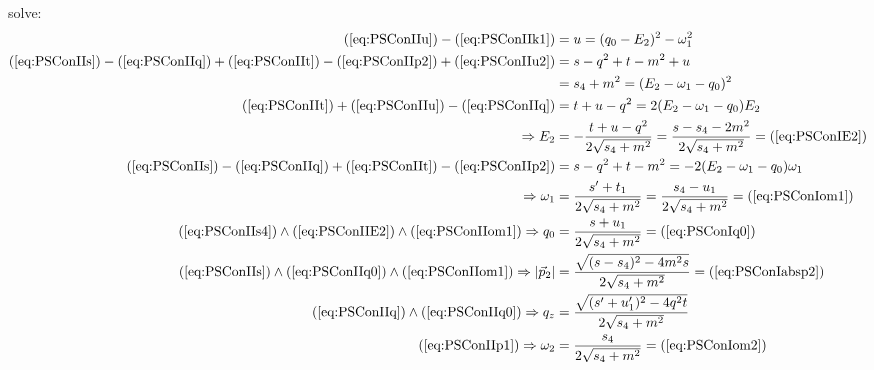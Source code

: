 solve:
\begin{align}
(\ref{eq:PSConIIu})-(\ref{eq:PSConIIk1}) &= u=(q_0-E_2)^2-\omega_1^2 \label{eq:PSConIIu2}\\
(\ref{eq:PSConIIs}) - (\ref{eq:PSConIIq}) + (\ref{eq:PSConIIt}) - (\ref{eq:PSConIIp2}) + (\ref{eq:PSConIIu2}) &= s-q^2+t-m^2+u\\
 &= s_4+m^2 = (E_2-\omega_1-q_0)^2 \label{eq:PSConIIs4}\\
(\ref{eq:PSConIIt}) + (\ref{eq:PSConIIu}) - (\ref{eq:PSConIIq}) &= t+u-q^2 = 2(E_2-\omega_1-q_0)E_2\\
\Rightarrow E_2 &= -\frac{t+u-q^2}{2\sqrt{s_4+m^2}} =\frac{s-s_4-2m^2}{2\sqrt{s_4+m^2}} = (\ref{eq:PSConIE2}) \label{eq:PSConIIE2}\\
(\ref{eq:PSConIIs}) - (\ref{eq:PSConIIq}) + (\ref{eq:PSConIIt}) - (\ref{eq:PSConIIp2}) &= s-q^2+t-m^2 = -2(E_2-\omega_1-q_0)\omega_1\\
\Rightarrow \omega_1 &= \frac{s'+t_1}{2\sqrt{s_4+m^2}} =\frac{s_4-u_1}{2\sqrt{s_4+m^2}} = (\ref{eq:PSConIom1}) \label{eq:PSConIIom1}\\
(\ref{eq:PSConIIs4}) \land (\ref{eq:PSConIIE2}) \land (\ref{eq:PSConIIom1}) \Rightarrow q_0 &= \frac{s+u_1}{2\sqrt{s_4+m^2}} = (\ref{eq:PSConIq0}) \label{eq:PSConIIq0}\\
(\ref{eq:PSConIIs}) \land (\ref{eq:PSConIIq0}) \land (\ref{eq:PSConIIom1}) \Rightarrow \left|\vec p_2\right| &= \frac{\sqrt{(s-s_4)^2-4m^2 s}}{2\sqrt{s_4+m^2}} = (\ref{eq:PSConIabsp2}) \label{eq:PSConIIabsp2}\\
(\ref{eq:PSConIIq}) \land (\ref{eq:PSConIIq0}) \Rightarrow q_z &= \frac{\sqrt{(s'+u_1')^2-4q^2t}}{2\sqrt{s_4+m^2}} \label{eq:PSConIIqz}\\
(\ref{eq:PSConIIp1}) \Rightarrow \omega_2 &= \frac{s_4}{2\sqrt{s_4+m^2}} = (\ref{eq:PSConIom2}) \label{eq:PSConIIom2}\\
\end{align}
